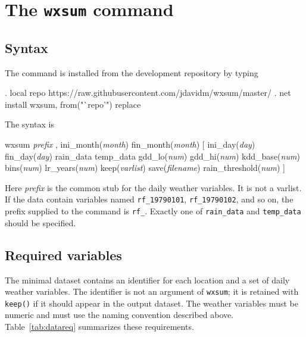 \section{The \texttt{wxsum} command}

\subsection{Syntax}

The command is installed from the development repository by typing

\begin{stlog}
. local repo https://raw.githubusercontent.com/jdavidm/wxsum/master/
. net install wxsum, from("`repo'") replace
\end{stlog}

The syntax is

\begin{stsyntax}
wxsum {\it prefix\/} , ini\_month({\it month\/}) fin\_month({\it month\/})
    [ ini\_day({\it day\/}) fin\_day({\it day\/}) rain\_data temp\_data
      gdd\_lo({\it num\/}) gdd\_hi({\it num\/}) kdd\_base({\it num\/})
      bins({\it num\/}) lr\_years({\it num\/}) keep({\it varlist\/})
      save({\it filename\/}) rain\_threshold({\it num\/}) ]
\end{stsyntax}

Here \textit{prefix} is the common stub for the daily weather variables. It is not a varlist. If the data contain variables named \texttt{rf\_19790101}, \texttt{rf\_19790102}, and so on, the prefix supplied to the command is \texttt{rf\_}. Exactly one of \texttt{rain\_data} and \texttt{temp\_data} should be specified.

\subsection{Required variables}

The minimal dataset contains an identifier for each location and a set of daily weather variables. The identifier is not an argument of \texttt{wxsum}; it is retained with \texttt{keep()} if it should appear in the output dataset. The weather variables must be numeric and must use the naming convention described above. Table~\ref{tab:datareq} summarizes these requirements.

